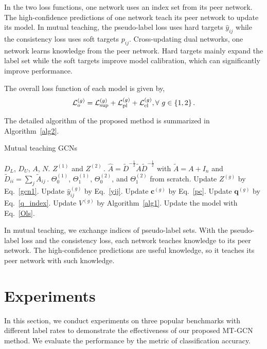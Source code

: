 \documentclass{article}
\newcommand{\p}{{\bm c}}
\newcommand{\q}{{\bm q}}
\begin{document}
In the two loss functions, one network uses an index set from its peer network. The high-confidence predictions of one network teach its peer network to update its model. In mutual teaching, the pseudo-label loss uses hard targets $\hat{y}_{ij}$ while the consistency loss uses soft targets $p_{ij}$. Cross-updating dual networks, one network learns knowledge from the peer network. Hard targets mainly expand the label set while the soft targets improve model calibration, which can significantly improve performance.

The overall loss function of each model is given by,
\begin{equation}\label{Ols}
\mathcal{L}_{o}^{(g)}=\mathcal{L}_{\rm sup}^{(g)}+\mathcal{L}_{\rm pl}^{(g)}+ \mathcal{L}_{\rm cl}^{(g)},  \forall~g\in\{1,2\}\,.
\end{equation}


The detailed algorithm of the proposed method is summarized in Algorithm~\ref{alg2}.
\begin{algorithm}[ht]
\caption{Mutual teaching GCNs}\label{alg2}
\begin{algorithmic}[1]
 $D_L$, $D_U$, $A$, $N$.
 $Z^{(1)}$ and $Z^{(2)}\,$.
 $\hat{A}=\tilde{D}^{-\frac{1}{2}}\tilde{A}\tilde{D}^{-\frac{1}{2}}$ with $\tilde{A}=A+I_n$ and $\tilde{D}_{ii}=\sum_j\tilde{A}_{ij}\,$. $\Theta_0^{(1)}$, $\Theta_1^{(1)}$, $\Theta_0^{(2)}$, and $\Theta_1^{(2)}$ from scratch.
        \State Update $Z^{(g)}$ by Eq.~\eqref{gcn1}.
        \State Update $\hat{y}_{ij}^{(g)}$ by Eq.~\eqref{yij}.
        \State Update $\p^{(g)}$ by Eq.~\eqref{pc}.
        \State Update $\q^{(g)}$ by Eq.~\eqref{q_index}.
        \State Update $V^{(g)}$ by Algorithm~\ref{alg1}.
    \EndFor
        \State Update the model with  Eq.~\eqref{Ols}.
    \EndFor
\EndFor
\end{algorithmic}
\end{algorithm}

In mutual teaching, we exchange indices of pseudo-label sets. With the pseudo-label loss and the consistency loss, each network teaches knowledge to its peer network. The high-confidence predictions are useful knowledge, so it teaches its peer network with such knowledge.
\section{Experiments}\label{Experiments}
In this section, we conduct experiments on three popular benchmarks with different label rates to demonstrate the effectiveness of our proposed MT-GCN method. We evaluate the performance by the metric of classification accuracy.
\end{document}
